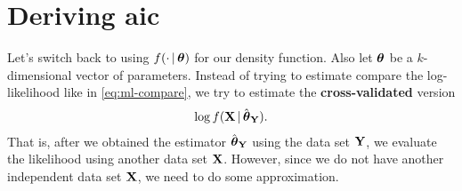 \documentclass[a4paper]{article}
\begin{document}
\section{Deriving \texorpdfstring{\acrshort{aic}}{AIC}}

Let's switch back to using $f(\cdot\,|\,\boldsymbol{\theta})$ for our density function.
Also let $\boldsymbol{\theta}$ be a $k$-dimensional vector of parameters.
Instead of trying to estimate compare the log-likelihood like in \eqref{eq:ml-compare},
we try to estimate the \textbf{cross-validated} version
\begin{align*}
	\log f(\mathbf{X}\,|\,\hat{\boldsymbol{\theta}}_{\mathbf{Y}}).
\end{align*}
That is, after we obtained the estimator $\hat{\boldsymbol{\theta}}_{\mathbf{Y}}$ using the data set $\mathbf{Y}$,
we evaluate the likelihood using another data set $\mathbf{X}$.
However, since we do not have another independent data set $\mathbf{X}$, we need to do some approximation.
\end{document}

